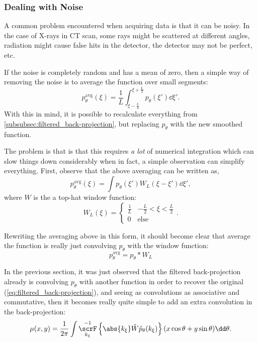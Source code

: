 \documentclass[
  a4paper,             %
  11pt,                %
  oneside,             %
  onecolumn,           %
  bibliography=totoc,  %
  final,               %
]{scrartcl}
\DeclareMathOperator{\FT}{\scrF}
\begin{document}
\subsubsection{Dealing with Noise}
\label{subsubsec:dealing_with_noise}

A common problem encountered when acquiring data is that it can be noisy.  In
the case of X-rays in \gls{CT} scan, some rays might be scattered at different
angles, radiation might cause false hits in the detector, the detector may not
be perfect, etc.

If the noise is completely random and has a mean of zero, then a simple way of
removing the noise is to average the function over small segments:
\begin{equation}
  p_{\theta}^{\text{avg}}(\xi) = \frac{1}{L} \int_{\xi - \frac{L}{2}}^{\xi + \frac{L}{2}} p_{\theta}(\xi') \dd \xi'.
\end{equation}
With this in mind, it is possible to recalculate everything from
\cref{subsubsec:filtered_back-projection}, but replacing \(p_{\theta}\) with the
new smoothed function.

The problem is that is that this requires \emph{a lot} of numerical integration
which can slow things down considerably when in fact, a simple observation can
simplify everything.  First, observe that the above averaging can be written as,
\begin{equation}
  p_{\theta}^{\text{avg}}(\xi) = \int p_{\theta}(\xi') W_{L}(\xi - \xi') \dd \xi',
\end{equation}
where \(W\) is the a top-hat window function:
\begin{equation}
  W_{L}(\xi) =
  \begin{cases}
    \frac{1}{L} & -\frac{L}{2} < \xi < \frac{L}{2} \\
    0 & \text{else}
  \end{cases}.
\end{equation}

Rewriting the averaging above in this form, it should become clear that average
the function is really just convolving \(p_{\theta}\) with the window function:
\begin{equation}
  p_{\theta}^{\text{avg}} = p_{\theta} * W_{L}
\end{equation}

In the previous section, it was just observed that the filtered back-projection
already is convolving \(p_{\theta}\) with another function in order to recover
the original (\cref{eq:filtered_back-projection}), and seeing as convolutions as
associative and commutative, then it becomes really quite simple to add an extra
convolution in the back-projection:
\begin{equation}
  \mu(x, y) = \frac{1}{2\pi} \int \FT^{-1}_{k_{\xi}} \left\{ \abs{k_{\xi}} \hat W \hat p_{\theta}(k_{\xi}) \right\}(x \cos \theta + y \sin \theta) \dd \theta.
\end{equation}
\end{document}
